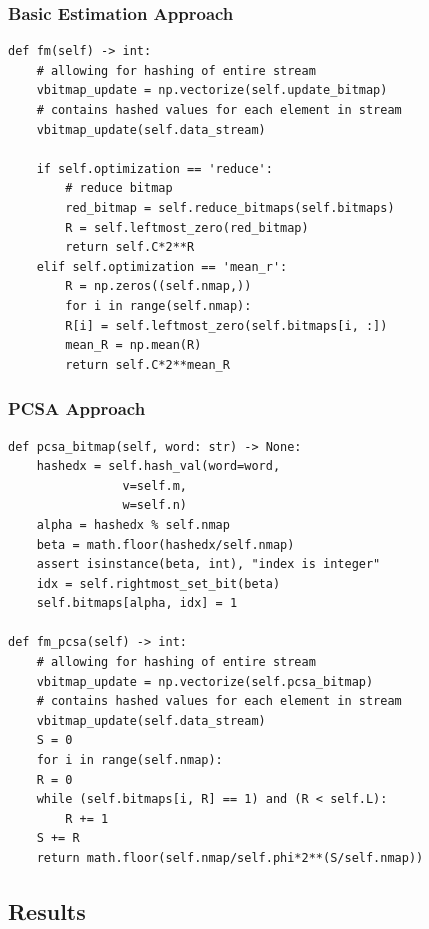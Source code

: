 \documentclass[11pt]{article}
\begin{document}
\subsubsection*{Basic Estimation Approach}
\label{sec:org2619bfd}
\begin{verbatim}
def fm(self) -> int:
	# allowing for hashing of entire stream
	vbitmap_update = np.vectorize(self.update_bitmap)
	# contains hashed values for each element in stream
	vbitmap_update(self.data_stream)

	if self.optimization == 'reduce':
	    # reduce bitmap
	    red_bitmap = self.reduce_bitmaps(self.bitmaps)
	    R = self.leftmost_zero(red_bitmap)
	    return self.C*2**R
	elif self.optimization == 'mean_r':
	    R = np.zeros((self.nmap,))
	    for i in range(self.nmap):
		R[i] = self.leftmost_zero(self.bitmaps[i, :])
	    mean_R = np.mean(R)
	    return self.C*2**mean_R
\end{verbatim}

\subsubsection*{PCSA Approach}
\label{sec:org0187011}
\begin{verbatim}
def pcsa_bitmap(self, word: str) -> None:
    hashedx = self.hash_val(word=word,
			    v=self.m,
			    w=self.n)
    alpha = hashedx % self.nmap
    beta = math.floor(hashedx/self.nmap)
    assert isinstance(beta, int), "index is integer"
    idx = self.rightmost_set_bit(beta)
    self.bitmaps[alpha, idx] = 1

def fm_pcsa(self) -> int:
    # allowing for hashing of entire stream
    vbitmap_update = np.vectorize(self.pcsa_bitmap)
    # contains hashed values for each element in stream
    vbitmap_update(self.data_stream)
    S = 0
    for i in range(self.nmap):
	R = 0
	while (self.bitmaps[i, R] == 1) and (R < self.L):
	    R += 1
	S += R
    return math.floor(self.nmap/self.phi*2**(S/self.nmap))
\end{verbatim}
\subsection*{Results}
\label{sec:org1053d1b}
\end{document}

